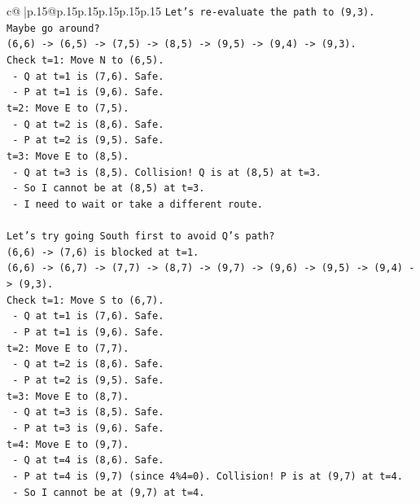 \documentclass{article}
\begin{document}
{\begin{supertabular}{c@{$\;$}|p{.15\linewidth}@{}p{.15\linewidth}p{.15\linewidth}p{.15\linewidth}p{.15\linewidth}p{.15\linewidth}}
{{{\texttt{Let's re{-}evaluate the path to (9,3).} \\
\texttt{Maybe go around?} \\
\texttt{(6,6) {-}> (6,5) {-}> (7,5) {-}> (8,5) {-}> (9,5) {-}> (9,4) {-}> (9,3).} \\
\texttt{Check t=1: Move N to (6,5).} \\
\texttt{  {-} Q at t=1 is (7,6). Safe.} \\
\texttt{  {-} P at t=1 is (9,6). Safe.} \\
\texttt{t=2: Move E to (7,5).} \\
\texttt{  {-} Q at t=2 is (8,6). Safe.} \\
\texttt{  {-} P at t=2 is (9,5). Safe.} \\
\texttt{t=3: Move E to (8,5).} \\
\texttt{  {-} Q at t=3 is (8,5). Collision! Q is at (8,5) at t=3.} \\
\texttt{  {-} So I cannot be at (8,5) at t=3.} \\
\texttt{  {-} I need to wait or take a different route.} \\
\\ 
\texttt{Let's try going South first to avoid Q's path?} \\
\texttt{(6,6) {-}> (7,6) is blocked at t=1.} \\
\texttt{(6,6) {-}> (6,7) {-}> (7,7) {-}> (8,7) {-}> (9,7) {-}> (9,6) {-}> (9,5) {-}> (9,4) {-}> (9,3).} \\
\texttt{Check t=1: Move S to (6,7).} \\
\texttt{  {-} Q at t=1 is (7,6). Safe.} \\
\texttt{  {-} P at t=1 is (9,6). Safe.} \\
\texttt{t=2: Move E to (7,7).} \\
\texttt{  {-} Q at t=2 is (8,6). Safe.} \\
\texttt{  {-} P at t=2 is (9,5). Safe.} \\
\texttt{t=3: Move E to (8,7).} \\
\texttt{  {-} Q at t=3 is (8,5). Safe.} \\
\texttt{  {-} P at t=3 is (9,6). Safe.} \\
\texttt{t=4: Move E to (9,7).} \\
\texttt{  {-} Q at t=4 is (8,6). Safe.} \\
\texttt{  {-} P at t=4 is (9,7) (since 4\%4=0). Collision! P is at (9,7) at t=4.} \\
\texttt{  {-} So I cannot be at (9,7) at t=4.} \\
}}}
\end{supertabular}}
\end{document}
